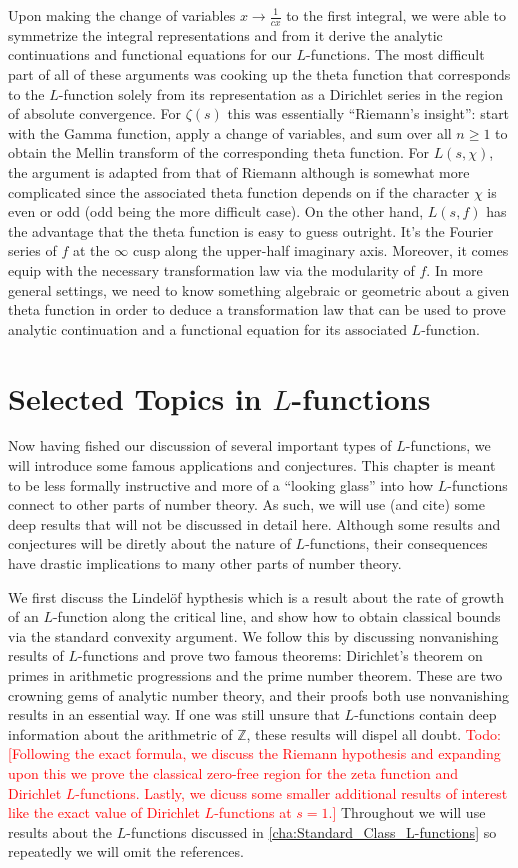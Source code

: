 \documentclass[12pt]{book}
\theoremstyle{definition}\newframedtheorem{method}{Method}
\newcommand{\Z}{\mathbb{Z}}
\newcommand{\z}{\zeta}
\newcommand{\<}{\langle}
\renewcommand{\>}{\rangle}
\newcommand{\todo}[1]{\textcolor{red}{\sf Todo: [#1]}}
\begin{document}
      Upon making the change of variables $x \to \frac{1}{cx}$ to the first integral, we were able to symmetrize the integral representations and from it derive the analytic continuations and functional equations for our $L$-functions. The most difficult part of all of these arguments was cooking up the theta function that corresponds to the $L$-function solely from its representation as a Dirichlet series in the region of absolute convergence. For $\z(s)$ this was essentially ``Riemann's insight'': start with the Gamma function, apply a change of variables, and sum over all $n \ge 1$ to obtain the Mellin transform of the corresponding theta function. For $L(s,\chi)$, the argument is adapted from that of Riemann although is somewhat more complicated since the associated theta function depends on if the character $\chi$ is even or odd (odd being the more difficult case). On the other hand, $L(s,f)$ has the advantage that the theta function is easy to guess outright. It's the Fourier series of $f$ at the $\infty$ cusp along the upper-half imaginary axis. Moreover, it comes equip with the necessary transformation law via the modularity of $f$. In more general settings, we need to know something algebraic or geometric about a given theta function in order to deduce a transformation law that can be used to prove analytic continuation and a functional equation for its associated $L$-function.
\chapter{Selected Topics in \texorpdfstring{$L$}{L}-functions}
  Now having fished our discussion of several important types of $L$-functions, we will introduce some famous applications and conjectures. This chapter is meant to be less formally instructive and more of a ``looking glass'' into how $L$-functions connect to other parts of number theory. As such, we will use (and cite) some deep results that will not be discussed in detail here. Although some results and conjectures will be diretly about the nature of $L$-functions, their consequences have drastic implications to many other parts of number theory.

  We first discuss the Lindel\"of hypthesis which is a result about the rate of growth of an $L$-function along the critical line, and show how to obtain classical bounds via the standard convexity argument. We follow this by discussing nonvanishing results of $L$-functions and prove two famous theorems: Dirichlet's theorem on primes in arithmetic progressions and the prime number theorem. These are two crowning gems of analytic number theory, and their proofs both use nonvanishing results in an essential way. If one was still unsure that $L$-functions contain deep information about the arithmetric of $\Z$, these results will dispel all doubt. \todo{Following the exact formula, we discuss the Riemann hypothesis and expanding upon this we prove the classical zero-free region for the zeta function and Dirichlet $L$-functions. Lastly, we dicuss some smaller additional results of interest like the exact value of Dirichlet $L$-functions at $s = 1$.} Throughout we will use results about the $L$-functions discussed in \cref{cha:Standard_Class_L-functions} so repeatedly we will omit the references.
\end{document}
